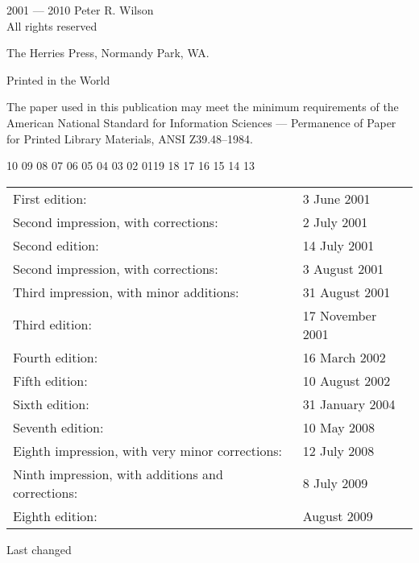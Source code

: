\documentclass[10pt,a4paper,extrafontsizes]{memoir}
\newcommand{\PWnote}[2]{}
\begin{document}
\PWnote{2009/06/26}{Updated the copyright page for 9th impression}
\begingroup
\footnotesize
\setlength{\parindent}{0pt}
\setlength{\parskip}{\baselineskip}
\textcopyright{} 2001 --- 2010 Peter R. Wilson \\
All rights reserved

The Herries Press, Normandy Park, WA.

Printed in the World 

The paper used in this publication may meet the minimum requirements
of the American National Standard for Information 
Sciences --- Permanence of Paper for Printed Library Materials, 
ANSI Z39.48--1984.

\PWnote{2009/07/08}{Changed manual date to 8 July 2009}
\begin{center}
10 09 08 07 06 05 04 03 02 01\hspace{2em}19 18 17 16 15 14 13
\end{center}
\begin{center}
\begin{tabular}{ll}
First edition:                        & 3 June 2001 \\
Second impression, with corrections:    & 2 July 2001 \\
Second edition:                       & 14 July 2001 \\
Second impression, with corrections:    & 3 August 2001 \\
Third impression, with minor additions: & 31 August 2001 \\
Third edition:                        & 17 November 2001 \\
Fourth edition:                       & 16 March 2002 \\
Fifth edition:                        & 10 August 2002 \\
Sixth edition:                        & 31 January 2004 \\
Seventh edition:                       & 10 May 2008 \\
Eighth impression, with very minor corrections: & 12 July 2008 \\
Ninth impression, with additions and corrections: & 8 July 2009 \\
Eighth edition:                        & August 2009 \\
\end{tabular}
\end{center}
Last changed \svnInfoDate
\end{document}
